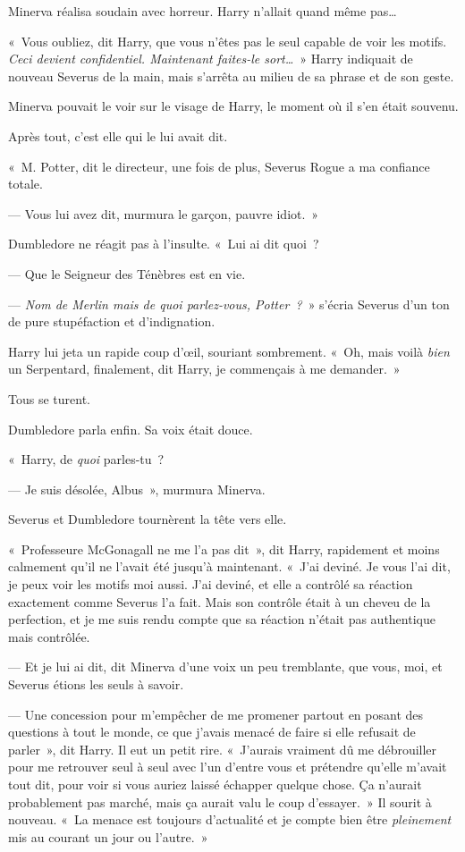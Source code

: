 Minerva réalisa soudain avec horreur.
Harry n'allait quand même pas…

«~Vous oubliez, dit Harry, que vous n'êtes pas le seul capable de voir les motifs.
\emph{Ceci devient confidentiel.
Maintenant faites-le sort…}~»
Harry indiquait de nouveau Severus de la main, mais s'arrêta au milieu de sa phrase et de son geste.

Minerva pouvait le voir sur le visage de Harry, le moment où il s'en était souvenu.

Après tout, c'est elle qui le lui avait dit.

«~M. Potter, dit le directeur, une fois de plus, Severus Rogue a ma confiance totale.

--- Vous lui avez dit, murmura le garçon, pauvre idiot.~»

Dumbledore ne réagit pas à l'insulte.
«~Lui ai dit quoi~?

--- Que le Seigneur des Ténèbres est en vie.

--- \emph{Nom de Merlin mais de quoi parlez-vous, Potter~?}~» s'écria Severus d'un ton de pure stupéfaction et d'indignation.

Harry lui jeta un rapide coup d'œil, souriant sombrement.
«~Oh, mais voilà \emph{bien} un Serpentard, finalement, dit Harry, je commençais à me demander.~»

Tous se turent.

Dumbledore parla enfin.
Sa voix était douce.

«~Harry, de \emph{quoi} parles-tu~?

--- Je suis désolée, Albus~», murmura Minerva.

Severus et Dumbledore tournèrent la tête vers elle.

«~Professeure McGonagall ne me l'a pas dit~», dit Harry, rapidement et moins calmement qu'il ne l'avait été jusqu'à maintenant.
«~J'ai deviné.
Je vous l'ai dit, je peux voir les motifs moi aussi.
J'ai deviné, et elle a contrôlé sa réaction exactement comme Severus l'a fait.
Mais son contrôle était à un cheveu de la perfection, et je me suis rendu compte que sa réaction n'était pas authentique mais contrôlée.

--- Et je lui ai dit, dit Minerva d'une voix un peu tremblante, que vous, moi, et Severus étions les seuls à savoir.

--- Une concession pour m'empêcher de me promener partout en posant des questions à tout le monde, ce que j'avais menacé de faire si elle refusait de parler~», dit Harry.
Il eut un petit rire.
«~J'aurais vraiment dû me débrouiller pour me retrouver seul à seul avec l'un d'entre vous et prétendre qu'elle m'avait tout dit, pour voir si vous auriez laissé échapper quelque chose.
Ça n'aurait probablement pas marché, mais ça aurait valu le coup d'essayer.~»
Il sourit à nouveau.
«~La menace est toujours d'actualité et je compte bien être \emph{pleinement} mis au courant un jour ou l'autre.~»

